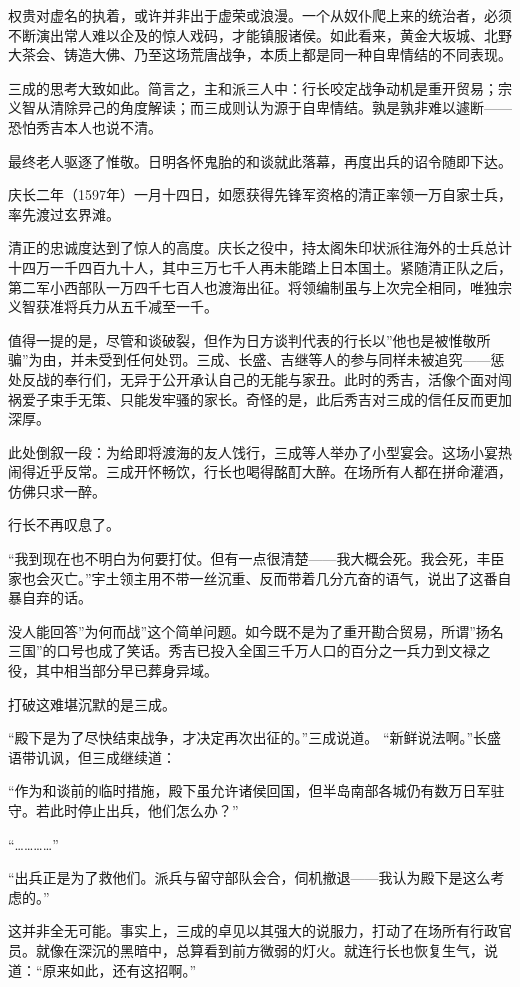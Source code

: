 \documentclass[
]{book}
\begin{document}
权贵对虚名的执着，或许并非出于虚荣或浪漫。一个从奴仆爬上来的统治者，必须不断演出常人难以企及的惊人戏码，才能镇服诸侯。如此看来，黄金大坂城、北野大茶会、铸造大佛、乃至这场荒唐战争，本质上都是同一种自卑情结的不同表现。

三成的思考大致如此。简言之，主和派三人中：行长咬定战争动机是重开贸易；宗义智从清除异己的角度解读；而三成则认为源于自卑情结。孰是孰非难以遽断------恐怕秀吉本人也说不清。

最终老人驱逐了惟敬。日明各怀鬼胎的和谈就此落幕，再度出兵的诏令随即下达。

庆长二年（1597年）一月十四日，如愿获得先锋军资格的清正率领一万自家士兵，率先渡过玄界滩。

清正的忠诚度达到了惊人的高度。庆长之役中，持太阁朱印状派往海外的士兵总计十四万一千四百九十人，其中三万七千人再未能踏上日本国土。紧随清正队之后，第二军小西部队一万四千七百人也渡海出征。将领编制虽与上次完全相同，唯独宗义智获准将兵力从五千减至一千。

值得一提的是，尽管和谈破裂，但作为日方谈判代表的行长以''他也是被惟敬所骗''为由，并未受到任何处罚。三成、长盛、吉继等人的参与同样未被追究------惩处反战的奉行们，无异于公开承认自己的无能与家丑。此时的秀吉，活像个面对闯祸爱子束手无策、只能发牢骚的家长。奇怪的是，此后秀吉对三成的信任反而更加深厚。

此处倒叙一段：为给即将渡海的友人饯行，三成等人举办了小型宴会。这场小宴热闹得近乎反常。三成开怀畅饮，行长也喝得酩酊大醉。在场所有人都在拼命灌酒，仿佛只求一醉。

行长不再叹息了。

``我到现在也不明白为何要打仗。但有一点很清楚------我大概会死。我会死，丰臣家也会灭亡。''宇土领主用不带一丝沉重、反而带着几分亢奋的语气，说出了这番自暴自弃的话。

没人能回答''为何而战''这个简单问题。如今既不是为了重开勘合贸易，所谓''扬名三国''的口号也成了笑话。秀吉已投入全国三千万人口的百分之一兵力到文禄之役，其中相当部分早已葬身异域。

打破这难堪沉默的是三成。

``殿下是为了尽快结束战争，才决定再次出征的。''三成说道。
``新鲜说法啊。''长盛语带讥讽，但三成继续道：

``作为和谈前的临时措施，殿下虽允许诸侯回国，但半岛南部各城仍有数万日军驻守。若此时停止出兵，他们怎么办？''

``\ldots\ldots\ldots\ldots{}''

``出兵正是为了救他们。派兵与留守部队会合，伺机撤退------我认为殿下是这么考虑的。''

这并非全无可能。事实上，三成的卓见以其强大的说服力，打动了在场所有行政官员。就像在深沉的黑暗中，总算看到前方微弱的灯火。就连行长也恢复生气，说道：``原来如此，还有这招啊。''
\end{document}
